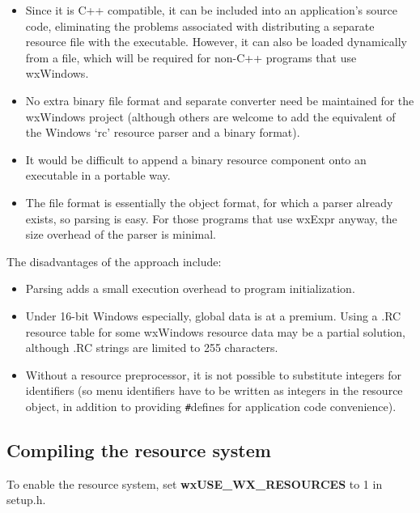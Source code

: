 \begin{itemize}\itemsep=0pt
\item Since it is C++ compatible, it can be included into an application's source code,
eliminating the problems associated with distributing a separate resource file
with the executable. However, it can also be loaded dynamically from a file, which will be required
for non-C++ programs that use wxWindows.
\item No extra binary file format and separate converter need be maintained for the wxWindows project
(although others are welcome to add the equivalent of the Windows `rc' resource
parser and a binary format).
\item It would be difficult to append a binary resource component onto an executable
in a portable way.
\item The file format is essentially the  object format, for which
a parser already exists, so parsing is easy. For those programs that use wxExpr
anyway, the size overhead of the parser is minimal.
\end{itemize}

The disadvantages of the approach include:

\begin{itemize}\itemsep=0pt
\item Parsing adds a small execution overhead to program initialization.
\item Under 16-bit Windows especially, global data is at a premium.
Using a .RC resource table for some wxWindows resource data may be a partial solution,
although .RC strings are limited to 255 characters.
\item Without a resource preprocessor, it is not possible to substitute integers
for identifiers (so menu identifiers have to be written as integers in the resource
object, in addition to providing \verb$#$defines for application code convenience).
\end{itemize}

\subsection{Compiling the resource system}

To enable the resource system, set {\bf wxUSE\_WX\_RESOURCES} to 1 in setup.h.

